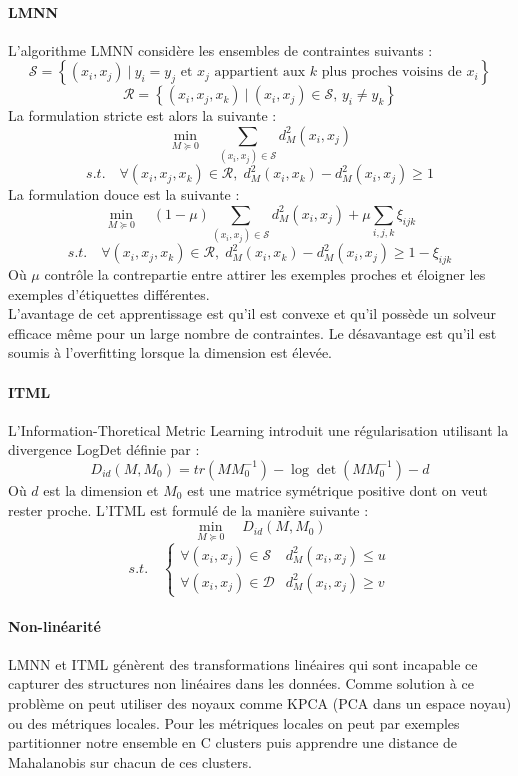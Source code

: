 \paragraph{LMNN}
L'algorithme LMNN considère les ensembles de contraintes suivants :
$$ \mathcal{S} = \left\{ (x_i, x_j)~|~y_i = y_j \text{ et } x_j \text{ appartient aux } k \text{ plus proches voisins de } x_i \right\} $$
$$ \mathcal{R} = \left\{ (x_i, x_j, x_k)~|~(x_i, x_j) \in \mathcal{S}, \, y_i \neq y_k \right\} $$
La formulation stricte est alors la suivante :
$$ \min_{M \succeq 0} \quad \sum_{(x_i, x_j) \in \mathcal{S}} d_M^2(x_i, x_j) $$
\vspace{-4mm}
$$ s.t. \quad \forall (x_i, x_j, x_k) \in \mathcal{R}, \; d_M^2(x_i, x_k) - d_M^2(x_i, x_j) \geqslant 1 $$
La formulation douce est la suivante :
$$ \min_{M \succeq 0} \quad (1 - \mu) \sum_{(x_i, x_j) \in \mathcal{S}} d_M^2(x_i, x_j) + \mu \sum_{i, j, k} \xi_{ijk} $$
\vspace{-4mm}
$$ s.t. \quad \forall (x_i, x_j, x_k) \in \mathcal{R}, \; d_M^2(x_i, x_k) - d_M^2(x_i, x_j) \geqslant 1 - \xi_{ijk} $$
Où $\mu$ contrôle la contrepartie entre attirer les exemples proches et éloigner les exemples d'étiquettes différentes. \\
L'avantage de cet apprentissage est qu'il est convexe et qu'il possède un solveur efficace même pour un large nombre de contraintes. Le désavantage est qu'il est soumis à l'overfitting lorsque la dimension est élevée.

\paragraph{ITML} L'Information-Thoretical Metric Learning introduit une régularisation utilisant la divergence LogDet définie par :
$$ D_{id}(M, M_0) = tr \left (MM_0^{-1} \right) - \log \det \left( MM_0^{-1} \right) - d $$
Où $d$ est la dimension et $M_0$ est une matrice symétrique positive dont on veut rester proche. L'ITML est formulé de la manière suivante :
$$ \min_{M \succeq 0} \quad D_{id}(M, M_0) $$
\vspace{-4mm}
$$ s.t. \quad \left\{ \begin{array}{ll}
	\forall (x_i, x_j) \in \mathcal{S} & d_M^2(x_i, x_j) \leqslant u \\
	\forall (x_i, x_j) \in \mathcal{D} & d_M^2(x_i, x_j) \geqslant v
\end{array} \right.$$

\paragraph{Non-linéarité}
LMNN et ITML génèrent des transformations linéaires qui sont incapable ce capturer des structures non linéaires dans les données. Comme solution à ce problème on peut utiliser des noyaux comme KPCA (PCA dans un espace noyau) ou des métriques locales. Pour les métriques locales on peut par exemples partitionner notre ensemble en C clusters puis apprendre une distance de Mahalanobis sur chacun de ces clusters.